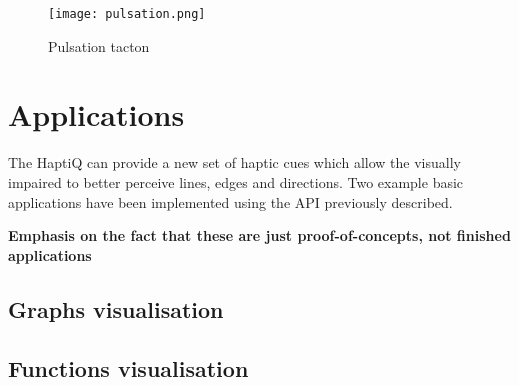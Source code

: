 \begin{figure}[H]
  \centering
  \texttt{[image: pulsation.png]}
  \caption{Pulsation tacton}
  \label{fig:pulsation}
\end{figure}

\section{Applications}

The HaptiQ can provide a new set of haptic cues which allow the visually impaired to better perceive lines, edges and directions. Two example basic applications have been implemented using the API previously described.

\textbf{Emphasis on the fact that these are just proof-of-concepts, not finished applications}

\subsection{Graphs visualisation}

\subsection{Functions visualisation}
